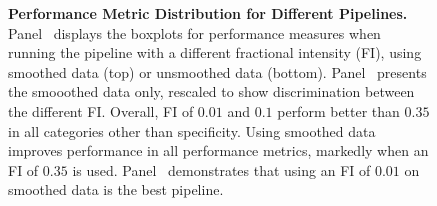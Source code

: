 \documentclass{elsarticle}\usepackage[]{graphicx}\usepackage[]{color}
\begin{document}
% 
% 












\begin{figure}
\hfill
\caption{{\bf Performance Metric Distribution for Different Pipelines.} Panel~\protect{} displays the boxplots for performance measures when running the pipeline with a different fractional intensity (FI), using smoothed data (top) or unsmoothed data (bottom).  Panel~\protect{} presents the smooothed data only, rescaled to show discrimination between the different FI. Overall, FI of $0.01$ and $0.1$ perform better than $0.35$ in all categories other than specificity.  Using smoothed data improves performance in all performance metrics, markedly when an FI of $0.35$ is used.  Panel~\protect{} demonstrates that using an FI of $0.01$ on smoothed data is the best pipeline.  }
\label{fig:metrics}
\end{figure}
\end{document}

